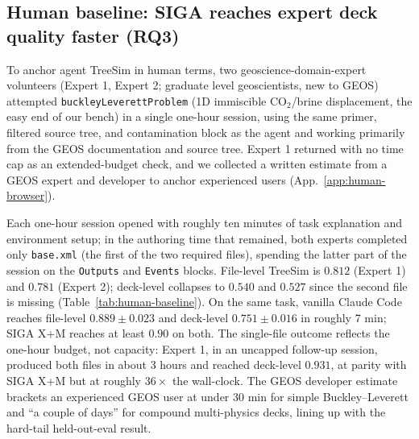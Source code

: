 \documentclass{article}
\begin{document}
\subsection{Human baseline: SIGA reaches expert deck quality faster (RQ3)}
\label{subsec:human-baseline}

To anchor agent TreeSim in human terms, two geoscience-domain-expert volunteers (Expert 1, Expert 2; graduate level geoscientists, new to GEOS) attempted \texttt{buckleyLeverettProblem} (1D immiscible CO$_2$/brine displacement, the easy end of our bench) in a single one-hour session, using the same primer, filtered source tree, and contamination block as the agent and working primarily from the GEOS documentation and source tree. Expert 1 returned with no time cap as an extended-budget check, and we collected a written estimate from a GEOS expert and developer to anchor experienced users (App.~\ref{app:human-browser}).

Each one-hour session opened with roughly ten minutes of task explanation and environment setup; in the authoring time that remained, both experts completed only \texttt{base.xml} (the first of the two required files), spending the latter part of the session on the \texttt{Outputs} and \texttt{Events} blocks. File-level TreeSim is $0.812$ (Expert 1) and $0.781$ (Expert 2); deck-level collapses to $0.540$ and $0.527$ since the second file is missing (Table~\ref{tab:human-baseline}). On the same task, vanilla Claude Code reaches file-level $0.889 \pm 0.023$ and deck-level $0.751 \pm 0.016$ in roughly 7 min; SIGA X+M reaches at least $0.90$ on both. The single-file outcome reflects the one-hour budget, not capacity: Expert 1, in an uncapped follow-up session, produced both files in about 3 hours and reached deck-level $\mathbf{0.931}$, at parity with SIGA X+M but at roughly $36\times$ the wall-clock. The GEOS developer estimate brackets an experienced GEOS user at under 30 min for simple Buckley--Leverett and ``a couple of days'' for compound multi-physics decks, lining up with the hard-tail held-out-eval result.
\end{document}
